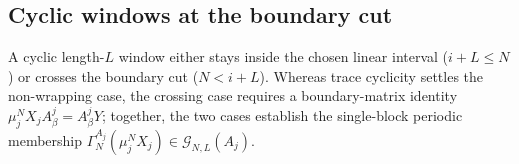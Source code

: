 \subsection{Cyclic windows at the boundary cut}\label{subsec:block_diagonal_boundary_crossing}

A cyclic length-$L$ window either stays inside the chosen linear interval
($i+L\le N$) or crosses the boundary cut ($N<i+L$). Whereas trace cyclicity
settles the non-wrapping case, the crossing case requires a boundary-matrix
identity $\mu_j^NX_jA^j_\beta=A^j_\beta Y$; together, the two cases establish
the single-block periodic membership
$\Gamma_N^{A_j}(\mu_j^NX_j)\in\mathcal G_{N,L}(A_j)$.




